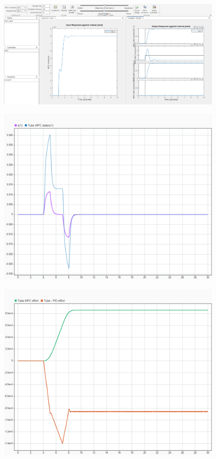 \begin{figure}
	\centering
	\includegraphics[width=1\linewidth]{../img/22}
	\caption{}
	\label{fig:22}
\end{figure}
\begin{figure}
	\centering
	\includegraphics[width=1\linewidth]{../img/23}
	\caption{}
	\label{fig:23}
\end{figure}
\begin{figure}
	\centering
	\includegraphics[width=1\linewidth]{../img/24}
	\caption{}
	\label{fig:24}
\end{figure}
